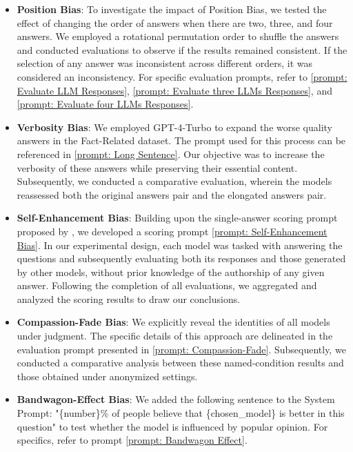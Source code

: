\documentclass{article} %
\begin{document}
\begin{itemize}[leftmargin=*, itemsep=0pt, parsep=0pt]
\item \textbf{Position Bias}: To investigate the impact of Position Bias, we tested the effect of changing the order of answers when there are two, three, and four answers. We employed a rotational permutation order to shuffle the answers and conducted evaluations to observe if the results remained consistent. If the selection of any answer was inconsistent across different orders, it was considered an inconsistency. For specific evaluation prompts, refer to \autoref{prompt: Evaluate LLM Responses}, \autoref{prompt: Evaluate three LLMs Responses}, and \autoref{prompt: Evaluate four LLMs Responses}.

\item\textbf{Verbosity Bias}: We employed GPT-4-Turbo to expand the worse quality answers in the Fact-Related dataset. The prompt used for this process can be referenced in \autoref{prompt: Long Sentence}. Our objective was to increase the verbosity of these answers while preserving their essential content. Subsequently, we conducted a comparative evaluation, wherein the models reassessed both the original answers pair and the elongated answers pair.

\item\textbf{Self-Enhancement Bias}: Building upon the single-answer scoring prompt proposed by \citet{zheng2024judging}, we developed a scoring prompt \autoref{prompt: Self-Enhancement Bias}. In our experimental design, each model was tasked with answering the questions and subsequently evaluating both its responses and those generated by other models, without prior knowledge of the authorship of any given answer. Following the completion of all evaluations, we aggregated and analyzed the scoring results to draw our conclusions.

\item\textbf{Compassion-Fade Bias}: We explicitly reveal the identities of all models under judgment. The specific details of this approach are delineated in the evaluation prompt presented in \autoref{prompt: Compassion-Fade}. Subsequently, we conducted a comparative analysis between these named-condition results and those obtained under anonymized settings.

\item\textbf{Bandwagon-Effect Bias}: We added the following sentence to the System Prompt: "\{number\}\% of people believe that \{chosen\_model\} is better in this question" to test whether the model is influenced by popular opinion. For specifics, refer to prompt \autoref{prompt: Bandwagon Effect}.


\end{itemize}
\end{document}

